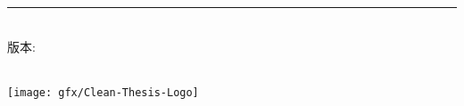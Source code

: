 %
\begin{titlepage}
	\flushright
	\hfill
	\vfill
	{\LARGE\thesisTitle} \par
	\rule[5pt]{\textwidth}{.4pt} \par
	{\Large\thesisTeam}
	\vfill
	\textit{\large\thesisDate} \\
	版本: \thesisVersion
\end{titlepage}


\begin{titlepage}
	\tgherosfont
	\centering
	
	{\Large \thesisUniversity} \\[4mm]
	\texttt{[image: gfx/Clean-Thesis-Logo]} \\[2mm]
	\textsf{\thesisUniversityInstitute} \\
	\textsf{\thesisUniversityGroup} \\
	
	\vfill
	{\large \thesisSubject} \\[5mm]
	{\LARGE \color{ctcolormain}\textbf{\thesisTitle} \\[10mm]}
	{\Large \thesisTeam} \\
	
	\vfill
    \begin{SAAuthors}
    \end{SAAuthors}
    \thesisUniversityGroup \\
	\thesisDate \\
\end{titlepage}


\hfill
\vfill
\small
\textbf{\thesisTitle} \\
\thesisSubject \\
\textbf{\thesisUniversity} \\
\thesisUniversityInstitute \\
\textit{\thesisUniversityGroup} \\
\thesisDate
